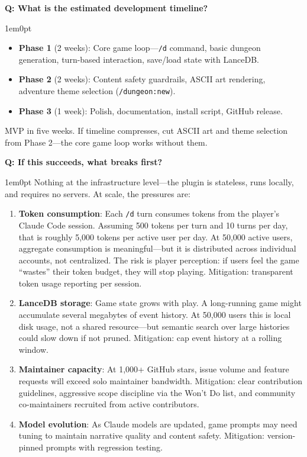 \documentclass[11pt,letterpaper]{article}
\newcounter{faqnum}
\newenvironment{faqpair}[1]{%
  \needspace{4\baselineskip}%
  \vspace{0.5em}%
  \refstepcounter{faqnum}%
  \noindent\textbf{\color{SectionBlue}Q\thefaqnum: #1}\par\nopagebreak[4]%
  \vspace{0.2em}%
  \begin{adjustwidth}{1em}{0pt}%
  \setlength{\parindent}{0pt}%
}{%
  \end{adjustwidth}%
  \vspace{0.5em}%
}
\begin{document}
\begin{faqpair}{What is the estimated development timeline?}\label{faq:timeline}
  \begin{itemize}[nosep]
    \item \textbf{Phase 1} (2 weeks): Core game loop---\texttt{/d} command, basic dungeon generation, turn-based interaction, save/load state with LanceDB.
    \item \textbf{Phase 2} (2 weeks): Content safety guardrails, ASCII art rendering, adventure theme selection (\texttt{/dungeon:new}).
    \item \textbf{Phase 3} (1 week): Polish, documentation, install script, GitHub release.
  \end{itemize}

  MVP in five weeks. If timeline compresses, cut ASCII art and theme selection from Phase 2---the core game loop works without them.
\end{faqpair}

\begin{faqpair}{If this succeeds, what breaks first?}\label{faq:scaling}
  Nothing at the infrastructure level---the plugin is stateless, runs locally, and requires no servers. At scale, the pressures are:

  \begin{enumerate}[nosep]
    \item \textbf{Token consumption}: Each \texttt{/d} turn consumes tokens from the player's Claude Code session. Assuming 500 tokens per turn and 10 turns per day, that is roughly 5,000 tokens per active user per day. At 50,000 active users, aggregate consumption is meaningful---but it is distributed across individual accounts, not centralized. The risk is player perception: if users feel the game ``wastes'' their token budget, they will stop playing. Mitigation: transparent token usage reporting per session.
    \item \textbf{LanceDB storage}: Game state grows with play. A long-running game might accumulate several megabytes of event history. At 50,000 users this is local disk usage, not a shared resource---but semantic search over large histories could slow down if not pruned. Mitigation: cap event history at a rolling window.
    \item \textbf{Maintainer capacity}: At 1,000+ GitHub stars, issue volume and feature requests will exceed solo maintainer bandwidth. Mitigation: clear contribution guidelines, aggressive scope discipline via the Won't Do list, and community co-maintainers recruited from active contributors.
    \item \textbf{Model evolution}: As Claude models are updated, game prompts may need tuning to maintain narrative quality and content safety. Mitigation: version-pinned prompts with regression testing.
  \end{enumerate}
\end{faqpair}
\end{document}

